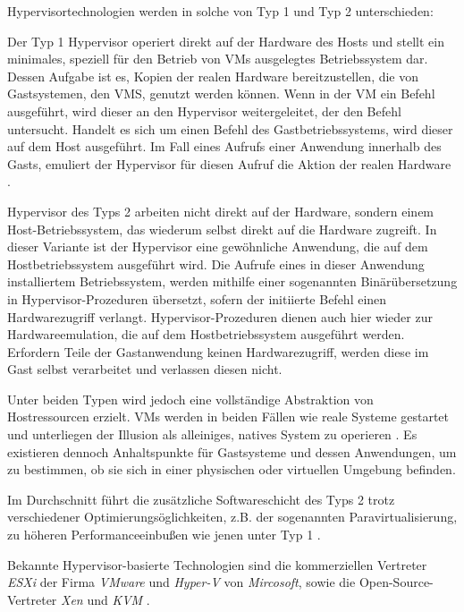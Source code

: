 \documentclass[../main.tex]{subfiles}
\begin{document}
      Hypervisortechnologien werden in solche von Typ 1 und Typ 2 unterschieden:

			Der Typ 1 Hypervisor operiert direkt auf der Hardware des Hosts und stellt ein minimales, speziell für den Betrieb von VMs ausgelegtes Betriebssystem dar. Dessen Aufgabe ist es, Kopien der realen Hardware bereitzustellen, die von Gastsystemen, den VMS, genutzt werden können. Wenn in der VM ein Befehl ausgeführt, wird dieser an den Hypervisor weitergeleitet, der den Befehl untersucht. Handelt es sich um einen Befehl des Gastbetriebssystems, wird dieser auf dem Host ausgeführt. Im Fall eines Aufrufs einer Anwendung innerhalb des Gasts, emuliert der Hypervisor für diesen Aufruf die Aktion der realen Hardware \cite[S.663ff.]{tanenbaumOS}.

			Hypervisor des Typs 2 arbeiten nicht direkt auf der Hardware, sondern einem Host-Betriebssystem, das wiederum selbst direkt auf die Hardware zugreift. In dieser Variante ist der Hypervisor eine gewöhnliche Anwendung, die auf dem Hostbetriebssystem ausgeführt wird. Die Aufrufe eines in dieser Anwendung installiertem Betriebssystem, werden mithilfe einer sogenannten Binärübersetzung in Hypervisor-Prozeduren übersetzt, sofern der initiierte Befehl einen Hardwarezugriff verlangt. Hypervisor-Prozeduren dienen auch hier wieder zur Hardwareemulation, die auf dem Hostbetriebssystem ausgeführt werden. Erfordern Teile der Gastanwendung keinen Hardwarezugriff, werden diese im Gast selbst verarbeitet und verlassen diesen nicht.

			Unter beiden Typen wird jedoch eine vollständige Abstraktion von Hostressourcen erzielt. VMs werden in beiden Fällen wie reale Systeme gestartet und unterliegen der Illusion als alleiniges, natives System zu operieren \cite[S.665f.]{tanenbaumOS}. Es existieren dennoch Anhaltspunkte für Gastsysteme und dessen Anwendungen, um zu bestimmen, ob sie sich in einer physischen oder virtuellen Umgebung befinden.

			Im Durchschnitt führt die zusätzliche Softwareschicht des Typs 2 trotz verschiedener Optimierungsöglichkeiten, z.B. der sogenannten Paravirtualisierung, zu höheren Performanceeinbußen wie jenen unter Typ 1 \cite[S.666f.]{tanenbaumOS}\cite[S.2]{dockerSec1}.


      Bekannte Hypervisor-basierte Technologien sind die kommerziellen Vertreter \emph{ESXi} der Firma \emph{VMware} und \emph{Hyper-V} von \emph{Mircosoft}, sowie die Open-Source-Vertreter \emph{Xen} und \emph{KVM} \cite[S.1]{dockerLXCKub}.
\end{document}

